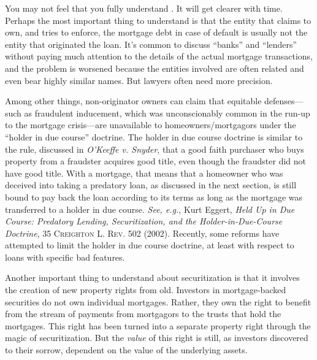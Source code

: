 
\item You may not feel that you fully understand .  It will
get
clearer with time.  Perhaps the most important thing to understand is that the
entity that claims to own, and tries to enforce, the mortgage debt in case of
default is usually not the entity that originated the loan.  It's common to
discuss ``banks'' and ``lenders'' without paying much attention to the details
of the actual mortgage transactions, and the problem is worsened because the
entities involved are often related and even bear highly similar names.  But
lawyers often need more precision.


\item Among other things, non-originator owners can claim that equitable
defenses---such as fraudulent inducement, which was unconscionably common in
the run-up to the mortgage crisis---are unavailable to homeowners/mortgagors
under the ``holder in due course'' doctrine.  The holder in due course doctrine
is similar to the rule, discussed in \textit{O'Keeffe v. Snyder}, that a good
faith purchaser who buys property from a fraudster acquires good title, even
though the fraudster did not have good title.  With a mortgage, that means that
a homeowner who was deceived into taking a predatory loan, as discussed in the
next section, is still bound to pay back the loan according to its terms as
long as the mortgage was transferred to a holder in due course.  \textit{See,
e.g.}, Kurt Eggert, \textit{Held Up in Due Course: Predatory Lending,
Securitization, and the Holder-in-Due-Course Doctrine}, 35 \textsc{Creighton L.
Rev}. 502 (2002).  Recently, some reforms have attempted to limit the holder in
due course doctrine, at least with respect to loans with specific bad features.


\item Another important thing to understand about securitization is that it
involves the creation of new property rights from old.  Investors in
mortgage-backed securities do not own individual mortgages. Rather, they own
the right to benefit from the stream of payments from mortgagors to the trusts
that hold the mortgages.  This right has been turned into a separate property
right through the magic of securitization.  But the \textit{value} of this
right is still, as investors discovered to their sorrow, dependent on the value
of the underlying assets.

